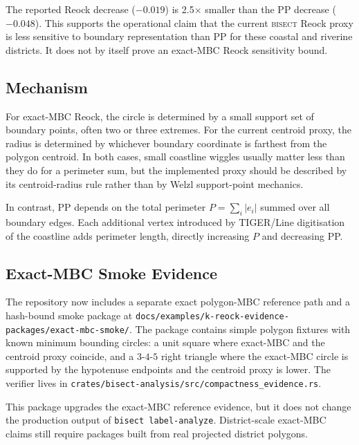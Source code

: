 The reported Reock decrease ($-0.019$) is 2.5$\times$ smaller than the PP
decrease ($-0.048$).  This supports the operational claim that the current
\textsc{bisect} Reock proxy is less sensitive to boundary representation than PP
for these coastal and riverine districts.  It does not by itself prove an
exact-MBC Reock sensitivity bound.

\subsection{Mechanism}

For exact-MBC Reock, the circle is determined by a small support set of boundary
points, often two or three extremes.  For the current centroid proxy, the radius
is determined by whichever boundary coordinate is farthest from the polygon
centroid.  In both cases, small coastline wiggles usually matter less than they
do for a perimeter sum, but the implemented proxy should be described by its
centroid-radius rule rather than by Welzl support-point mechanics.

In contrast, PP depends on the total perimeter $P = \sum_i |e_i|$ summed over all
boundary edges. Each additional vertex introduced by TIGER/Line digitisation of
the coastline adds perimeter length, directly increasing $P$ and decreasing PP.

\subsection{Exact-MBC Smoke Evidence}

The repository now includes a separate exact polygon-MBC reference path and a
hash-bound smoke package at
\texttt{docs/examples/k-reock-evidence-packages/exact-mbc-smoke/}.  The package
contains simple polygon fixtures with known minimum bounding circles: a unit
square where exact-MBC and the centroid proxy coincide, and a $3$-$4$-$5$ right
triangle where the exact-MBC circle is supported by the hypotenuse endpoints and
the centroid proxy is lower.  The verifier lives in
\texttt{crates/bisect-analysis/src/compactness\_evidence.rs}.

This package upgrades the exact-MBC reference evidence, but it does not change
the production output of \texttt{bisect label-analyze}.  District-scale exact-MBC
claims still require packages built from real projected district polygons.
